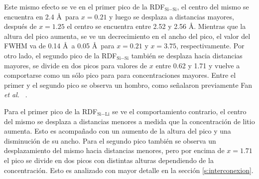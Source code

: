Este mismo efecto se ve en el primer pico de la RDF$_{\text{Si}-\text{Si}}$, el 
centro del mismo
se encuentra en 2.4 \AA\ para $x = 0.21$ y luego se desplaza a distancias
mayores, después de $x = 1.25$ el centro se encuentra entre 2.52 y 2.56 \AA.
Mientras que la altura del pico aumenta, se ve un decrecimiento en el ancho 
del pico, el valor del FWHM va de 0.14 \AA\ a 0.05 \AA\ para $x = 0.21$ y 
$x = 3.75$, respectivamente. Por otro lado, el segundo pico de la RDF$_{\text{Si}-\text{Si}}$
también se desplaza hacia distancias mayores, se divide en dos picos para valores 
de $x$ entre 0.62 y 1.71 y vuelve a comportarse como un sólo pico para para 
concentraciones mayores. Entre el primer y el segundo pico se observa un hombro,
como señalaron previamente Fan \textit{et al.} ~\cite{fan2013}.%

Para el primer pico de la RDF$_{\text{Si}-\text{Li}}$ se ve el comportamiento contrario, el 
centro del mismo se desplaza a distancias menores a medida que la concentración
de litio aumenta. Esto es acompañado con un aumento de la altura del pico y una
disminución de su ancho. Para el segundo pico también se observa un desplazamiento
del mismo hacia distancias menores, pero por encima de $x = 1.71$ el pico se
divide en dos picos con distintas alturas dependiendo de la concentración. Esto
es analizado con mayor detalle en la sección \ref{s:interconexion}.
